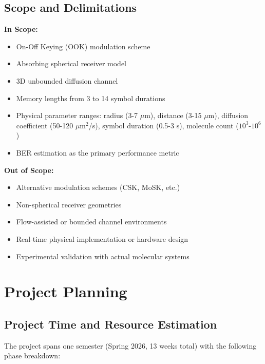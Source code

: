 \documentclass[a4paper,12pt]{report}
\begin{document}
\subsection{Scope and Delimitations}

\textbf{In Scope:}
\begin{itemize}
    \item On-Off Keying (OOK) modulation scheme
    \item Absorbing spherical receiver model
    \item 3D unbounded diffusion channel
    \item Memory lengths from 3 to 14 symbol durations
    \item Physical parameter ranges: radius (3-7 $\mu$m), distance (3-15 $\mu$m), diffusion coefficient (50-120 $\mu$m$^2$/s), symbol duration (0.5-3 s), molecule count ($10^3$-$10^6$)
    \item BER estimation as the primary performance metric
\end{itemize}

\textbf{Out of Scope:}
\begin{itemize}
    \item Alternative modulation schemes (CSK, MoSK, etc.)
    \item Non-spherical receiver geometries
    \item Flow-assisted or bounded channel environments
    \item Real-time physical implementation or hardware design
    \item Experimental validation with actual molecular systems
\end{itemize}

\section{Project Planning}

\subsection{Project Time and Resource Estimation}

The project spans one semester (Spring 2026, 13 weeks total) with the following phase breakdown:
\end{document}
